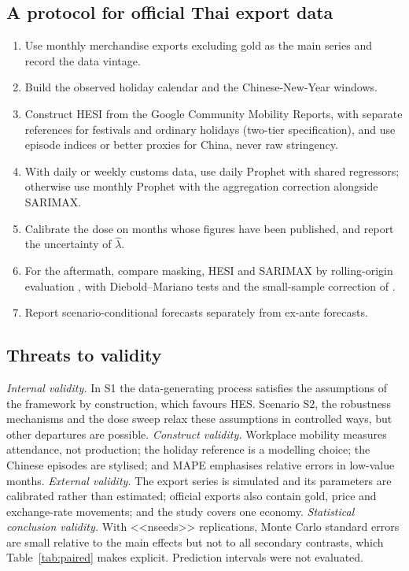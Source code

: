 \documentclass{article}
\theoremstyle{plain}
\theoremstyle{definition}
\theoremstyle{remark}
\begin{document}
\subsection{A protocol for official Thai export data}\label{sec:protocol}
\begin{enumerate}
\item Use monthly merchandise exports excluding gold as the main series and record the data vintage.
\item Build the observed holiday calendar and the Chinese-New-Year windows.
\item Construct HESI from the Google Community Mobility Reports, with separate references for festivals and ordinary holidays (two-tier specification), and use episode indices or better proxies for China, never raw stringency.
\item With daily or weekly customs data, use daily Prophet with shared regressors; otherwise use monthly Prophet with the aggregation correction alongside SARIMAX.
\item Calibrate the dose on months whose figures have been published, and report the uncertainty of $\hat\lambda$.
\item For the aftermath, compare masking, HESI and SARIMAX by rolling-origin evaluation \citep{tashman2000out}, with Diebold--Mariano tests and the small-sample correction of \citet{harvey1997testing}.
\item Report scenario-conditional forecasts separately from ex-ante forecasts.
\end{enumerate}

\subsection{Threats to validity}
\emph{Internal validity.} In S1 the data-generating process satisfies the assumptions of the framework by construction, which favours HES. Scenario S2, the robustness mechanisms and the dose sweep relax these assumptions in controlled ways, but other departures are possible. \emph{Construct validity.} Workplace mobility measures attendance, not production; the holiday reference is a modelling choice; the Chinese episodes are stylised; and MAPE emphasises relative errors in low-value months. \emph{External validity.} The export series is simulated and its parameters are calibrated rather than estimated; official exports also contain gold, price and exchange-rate movements; and the study covers one economy. \emph{Statistical conclusion validity.} With <<nseeds>> replications, Monte Carlo standard errors are small relative to the main effects but not to all secondary contrasts, which Table~\ref{tab:paired} makes explicit. Prediction intervals were not evaluated.
\end{document}
